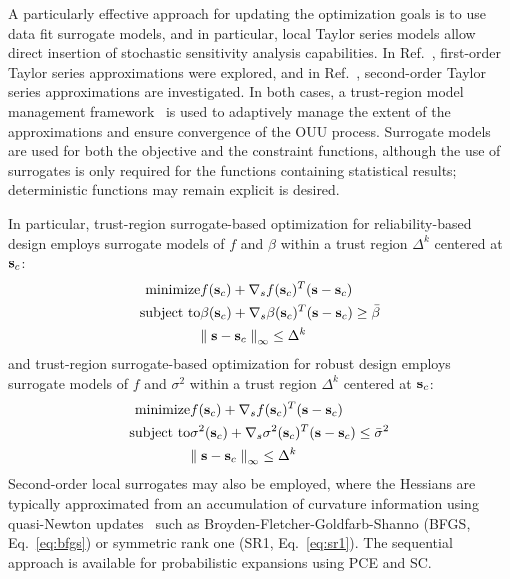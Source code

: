 A particularly effective approach for updating the optimization goals
is to use data fit surrogate models, and in particular, local Taylor
series models allow direct insertion of stochastic sensitivity
analysis capabilities.  In Ref.~\cite{Eld05}, first-order Taylor
series approximations were explored, and in Ref.~\cite{Eld06a},
second-order Taylor series approximations are investigated.  In both
cases, a trust-region model management framework~\cite{Eld06b} is
used to adaptively manage the extent of the approximations and ensure
convergence of the OUU process.  Surrogate models are used for both
the objective and the constraint functions, although the use of
surrogates is only required for the functions containing statistical
results; deterministic functions may remain explicit is desired.

In particular, trust-region surrogate-based optimization for
reliability-based design employs surrogate models of $f$ and $\beta$
within a trust region $\Delta^k$ centered at ${\bf s}_c$:
\begin{eqnarray}
  {\rm minimize }     & f({\bf s}_c) + \nabla_s f({\bf s}_c)^T
({\bf s} - {\bf s}_c) \nonumber \\
  {\rm subject \ to } & \beta({\bf s}_c) + \nabla_s \beta({\bf s}_c)^T
({\bf s} - {\bf s}_c) \ge \bar{\beta} \\
& {\parallel {\bf s} - {\bf s}_c \parallel}_\infty \le \Delta^k \nonumber
\label{eq:rbdo_surr}
\end{eqnarray}
and trust-region surrogate-based optimization for robust design
employs surrogate models of $f$ and $\sigma^2$ within a trust region
$\Delta^k$ centered at ${\bf s}_c$:
\begin{eqnarray}
  {\rm minimize }     & f({\bf s}_c) + \nabla_s f({\bf s}_c)^T
({\bf s} - {\bf s}_c) \nonumber \\
  {\rm subject \ to } & \sigma^2({\bf s}_c) + \nabla_s \sigma^2({\bf s}_c)^T 
({\bf s} - {\bf s}_c) \le \bar{\sigma}^2 \\
& {\parallel {\bf s} - {\bf s}_c \parallel}_\infty \le \Delta^k \nonumber
\label{eq:rdo_surr}
\end{eqnarray}
Second-order local surrogates may also be employed, where the Hessians
are typically approximated from an accumulation of curvature
information using quasi-Newton updates~\cite{Noc99} such as
Broyden-Fletcher-Goldfarb-Shanno (BFGS, Eq.~\ref{eq:bfgs}) or
symmetric rank one (SR1, Eq.~\ref{eq:sr1}).  The sequential approach
is available for probabilistic expansions using PCE and SC.


